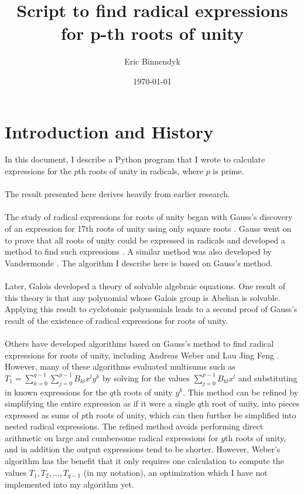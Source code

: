 \documentclass{article}
\title{Script to find radical expressions for p-th roots of unity}
\author{Eric Binnendyk}
\date{\today}
\begin{document}
\maketitle

\section{Introduction and History}
    In this document, I describe a Python program that I wrote to calculate expressions for the $ p $th roots of unity in radicals, where $ p $ is prime.\\
    \\
    The result presented here derives heavily from earlier research.\\
    \\
    The study of radical expressions for roots of unity began with Gauss's discovery of an expression for 17th roots of unity using only square roots \cite{17gon}. Gauss went on to prove that all roots of unity could be expressed in radicals and developed a method to find such expressions \cite{rootsunity}. A similar method was also developed by Vandermonde \cite{rootsunity-misc}. The algorithm I describe here is based on Gauss's method.\\
    \\
    Later, Galois developed a theory of solvable algebraic equations. One result of this theory is that any polynomial whose Galois group is Abelian is solvable. Applying this result to cyclotomic polynomials leads to a second proof of Gauss's result of the existence of radical expressions for roots of unity.\cite{weber-keckeisen}\\
    \\
    Others have developed algorithms based on Gauss's method to find radical expressions for roots of unity, including Andreas Weber \cite{weber} and Lau Jing Feng \cite{feng}. However, many of these algorithms evaluated multisums such as $ T_1 = \sum_{k = 0}^{q - 1} \sum_{j = 0}^{p - 1} B_{kl} x^l y^k $ by solving for the values $ \sum_{j = 0}^{p - 1} B_{kl} x^l $ and substituting in known expressions for the $ q $th roots of unity $ y^k $. This method can be refined by simplifying the entire expression as if it were a single $ q $th root of unity, into pieces expressed as sums of $ p $th roots of unity, which can then further be simplified into nested radical expressions. The refined method avoids performing direct arithmetic on large and cumbersome radical expressions for $ y $th roots of unity, and in addition the output expressions tend to be shorter. However, Weber's algorithm has the benefit that it only requires one calculation to compute the values $ T_1, T_2, \dots, T_{q - 1} $ (in my notation), an optimization which I have not implemented into my algorithm yet.\\
    \\
\end{document}
